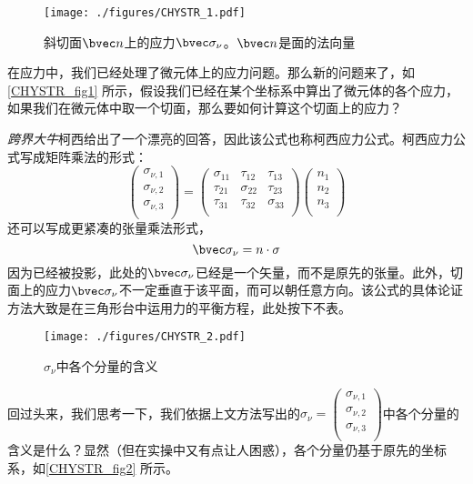 

\begin{figure}[ht]
\centering
\texttt{[image: ./figures/CHYSTR\_1.pdf]}
\caption{斜切面$\bvec n$上的应力$\bvec \sigma_\nu$。$\bvec n$是面的法向量} \label{CHYSTR_fig1}
\end{figure}

在应力中，我们已经处理了微元体上的应力问题。那么新的问题来了，如\autoref{CHYSTR_fig1} 所示，假设我们已经在某个坐标系中算出了微元体的各个应力，如果我们在微元体中取一个切面，那么要如何计算这个切面上的应力？

\textsl{跨界大牛}柯西给出了一个漂亮的回答，因此该公式也称柯西应力公式。柯西应力公式写成矩阵乘法的形式：
\begin{equation}\label{CHYSTR_eq1}
\begin{pmatrix}
\sigma_{\nu,1}\\
\sigma_{\nu,2}\\
\sigma_{\nu,3}\\
\end{pmatrix}
=
\begin{pmatrix}
\sigma_{11} & \tau_{12} & \tau_{13} \\
\tau_{21} & \sigma_{22} & \tau_{23} \\
\tau_{31} & \tau_{32} & \sigma_{33} \\
\end{pmatrix}
\begin{pmatrix}
n_1\\
n_2\\
n_3\\
\end{pmatrix}
\end{equation}
还可以写成更紧凑的张量乘法形式，
\begin{equation}
\bvec \sigma_\nu = n \cdot \sigma
\end{equation}
因为已经被投影，此处的$\bvec \sigma_\nu$已经是一个矢量，而不是原先的张量。此外，切面上的应力$\bvec \sigma_\nu$不一定垂直于该平面，而可以朝任意方向。该公式的具体论证方法大致是在三角形台中运用力的平衡方程，此处按下不表。

\begin{figure}[ht]
\centering
\texttt{[image: ./figures/CHYSTR\_2.pdf]}
\caption{$\sigma_\nu$中各个分量的含义} \label{CHYSTR_fig2}
\end{figure}

回过头来，我们思考一下，我们依据上文方法写出的$\sigma_\nu=
\begin{pmatrix}
\sigma_{\nu,1}\\
\sigma_{\nu,2}\\
\sigma_{\nu,3}\\
\end{pmatrix}$中各个分量的含义是什么？显然（但在实操中又有点让人困惑），各个分量仍基于原先的坐标系，如\autoref{CHYSTR_fig2} 所示。

